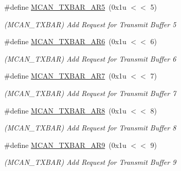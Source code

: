 \begin{DoxyCompactItemize}
\#define \mbox{\hyperlink{group__SAME70__MCAN_gade80b4d15c74198f0c81d3430b7f9b9b}{M\+C\+A\+N\+\_\+\+T\+X\+B\+A\+R\+\_\+\+A\+R5}}~(0x1u $<$$<$ 5)
\begin{DoxyCompactList}\small\item\em (M\+C\+A\+N\+\_\+\+T\+X\+B\+AR) Add Request for Transmit Buffer 5 \end{DoxyCompactList}\item 
\mbox{\label{group__SAME70__MCAN_ga4c81effd79147d7c881120ea241c66f7}} 
\#define \mbox{\hyperlink{group__SAME70__MCAN_ga4c81effd79147d7c881120ea241c66f7}{M\+C\+A\+N\+\_\+\+T\+X\+B\+A\+R\+\_\+\+A\+R6}}~(0x1u $<$$<$ 6)
\begin{DoxyCompactList}\small\item\em (M\+C\+A\+N\+\_\+\+T\+X\+B\+AR) Add Request for Transmit Buffer 6 \end{DoxyCompactList}\item 
\mbox{\label{group__SAME70__MCAN_ga26d783f1380c89661f246d23621bcc61}} 
\#define \mbox{\hyperlink{group__SAME70__MCAN_ga26d783f1380c89661f246d23621bcc61}{M\+C\+A\+N\+\_\+\+T\+X\+B\+A\+R\+\_\+\+A\+R7}}~(0x1u $<$$<$ 7)
\begin{DoxyCompactList}\small\item\em (M\+C\+A\+N\+\_\+\+T\+X\+B\+AR) Add Request for Transmit Buffer 7 \end{DoxyCompactList}\item 
\mbox{\label{group__SAME70__MCAN_gadac7cfd3e817608f097be1026c405e9e}} 
\#define \mbox{\hyperlink{group__SAME70__MCAN_gadac7cfd3e817608f097be1026c405e9e}{M\+C\+A\+N\+\_\+\+T\+X\+B\+A\+R\+\_\+\+A\+R8}}~(0x1u $<$$<$ 8)
\begin{DoxyCompactList}\small\item\em (M\+C\+A\+N\+\_\+\+T\+X\+B\+AR) Add Request for Transmit Buffer 8 \end{DoxyCompactList}\item 
\mbox{\label{group__SAME70__MCAN_gaaf206828e9094a2a768d25965fe9450c}} 
\#define \mbox{\hyperlink{group__SAME70__MCAN_gaaf206828e9094a2a768d25965fe9450c}{M\+C\+A\+N\+\_\+\+T\+X\+B\+A\+R\+\_\+\+A\+R9}}~(0x1u $<$$<$ 9)
\begin{DoxyCompactList}\small\item\em (M\+C\+A\+N\+\_\+\+T\+X\+B\+AR) Add Request for Transmit Buffer 9 \end{DoxyCompactList}\item 
$$
\end{DoxyCompactItemize}
